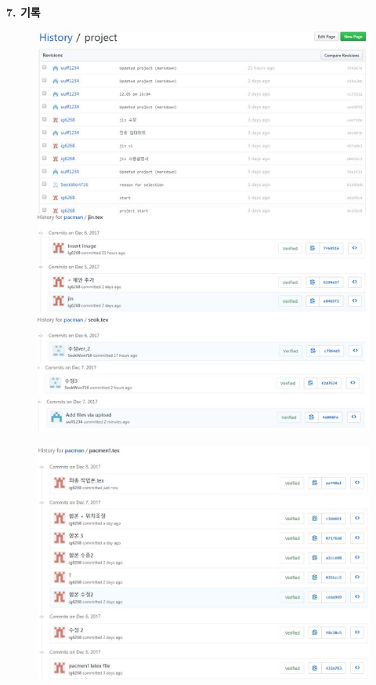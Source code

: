 \documentclass{article}
\begin{document}
\newpage
\begin{large}\textbf{7. 기록}\end{large}
 \begin{figure}[!h]
\centering
\includegraphics[width=1\columnwidth]{history}
\end{figure}
 \begin{figure}[!h]
\centering
\includegraphics[width=1\columnwidth]{history2}
\end{figure}
\end{document}

